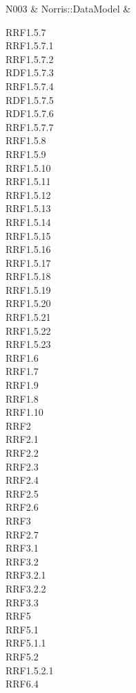 \begin{longtabu}
                N003 & Norris::DataModel & \parbox[t]{4cm}{ RRF1.5.7 \\ RRF1.5.7.1 \\ RRF1.5.7.2 \\ RDF1.5.7.3 \\ RRF1.5.7.4 \\ RDF1.5.7.5 \\ RDF1.5.7.6 \\ RRF1.5.7.7 \\ RRF1.5.8 \\ RRF1.5.9 \\ RRF1.5.10 \\ RRF1.5.11 \\ RRF1.5.12 \\ RRF1.5.13 \\ RRF1.5.14 \\ RRF1.5.15 \\ RRF1.5.16 \\ RRF1.5.17 \\ RRF1.5.18 \\ RRF1.5.19 \\ RRF1.5.20 \\ RRF1.5.21 \\ RRF1.5.22 \\ RRF1.5.23 \\ RRF1.6 \\ RRF1.7 \\ RRF1.9 \\ RRF1.8 \\ RRF1.10 \\ RRF2 \\ RRF2.1 \\ RRF2.2 \\ RRF2.3 \\ RRF2.4 \\ RRF2.5 \\ RRF2.6 \\ RRF3 \\ RRF2.7 \\ RRF3.1 \\ RRF3.2 \\ RRF3.2.1 \\ RRF3.2.2 \\ RRF3.3 \\ RRF5 \\ RRF5.1 \\ RRF5.1.1 \\ RRF5.2 \\ RRF1.5.2.1 \\ RRF6.4 }\\
                \hline

\end{longtabu}

